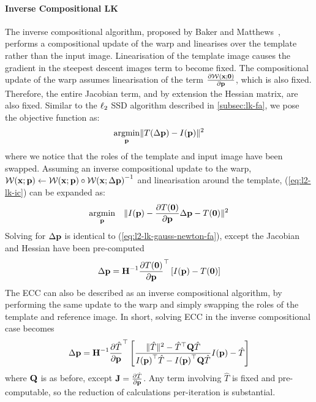\paragraph{Inverse Compositional LK}\label{subsubsec:lk-ic}
The inverse compositional algorithm, proposed by Baker and
Matthews~\cite{RefWorks:74}, performs a compositional update of the warp and
linearises over the template rather than the input image. Linearisation of the
template image causes the gradient in the steepest descent images term to become
fixed. The compositional update of the warp assumes linearisation of the term
$\frac{\partial \mathcal{W}(\boldsymbol{\mathbf{x}};\boldsymbol{\mathbf{0}})}{\partial \boldsymbol{\mathbf{p}}}$, which is also
fixed. Therefore, the entire Jacobian term, and by extension the Hessian matrix,
are also fixed. Similar to the $\ell_2$ SSD algorithm described in
\cref{subsec:lk-fa}, we pose the objective function as:
\begin{equation}\label{eq:l2-lk-ic}
    \argmin_{\p} \norm{T(\Delta \p) - I(\p)}^2
\end{equation}
where we notice that the roles of the template and input image have been
swapped. Assuming an inverse compositional update to the warp,
$\mathcal{W}(\boldsymbol{\mathbf{x}};\boldsymbol{\mathbf{p}}) \leftarrow \mathcal{W}(\boldsymbol{\mathbf{x}};\boldsymbol{\mathbf{p}}) \circ {\mathcal{W}(\boldsymbol{\mathbf{x}};\Delta \boldsymbol{\mathbf{p}})}^{-1}$
and linearisation around the template, (\ref{eq:l2-lk-ic}) can be expanded as:
\begin{equation}\label{eq:l2-lk-linearised-ic}
    \argmin_{\p} \quad \norm{I(\p) - \frac{\partial T(\zero)}{\partial \p} \Delta \p - T(\zero)}^2
\end{equation}
Solving for $\Delta \boldsymbol{\mathbf{p}}$ is identical to (\ref{eq:l2-lk-gauss-newton-fa}), except
the Jacobian and Hessian have been pre-computed
\begin{equation}\label{eq:l2-lk-gauss-newton-ic}
    \Delta \boldsymbol{\mathbf{p}} = \boldsymbol{\mathbf{H}}^{-1} \frac{\partial T(\boldsymbol{\mathbf{0}})}{\partial \boldsymbol{\mathbf{p}}}^{\top} \left[ I(\boldsymbol{\mathbf{p}}) - T(\boldsymbol{\mathbf{0}}) \right]
\end{equation}
The ECC can also be described as an inverse compositional algorithm, by
performing the same update to the warp and simply swapping the roles of the
template and reference image. In short, solving ECC in the inverse compositional
case becomes
\begin{equation}\label{eq:ecc-lk-gauss-newton-ic}
    \Delta \boldsymbol{\mathbf{p}} = \boldsymbol{\mathbf{H}}^{-1} \frac{\partial \hat{T}}{\partial \boldsymbol{\mathbf{p}}}^{\top} \left[ \frac{\lVert{} \hat{T} \rVert^2 - \hat{T}^{\top} \boldsymbol{\mathbf{Q}} \hat{T}}{{I(\boldsymbol{\mathbf{p}})}^{\top} \hat{T} - {I(\boldsymbol{\mathbf{p}})}^{\top} \boldsymbol{\mathbf{Q}} \hat{T}} I(\boldsymbol{\mathbf{p}}) - \hat{T} \right]
\end{equation}
where $\boldsymbol{\mathbf{Q}}$ is as before, except $\boldsymbol{\mathbf{J}} = \frac{\partial \hat{T}}{\partial \boldsymbol{\mathbf{p}}}$. 
Any term involving $\hat{T}$ is fixed and pre-computable, so the reduction of 
calculations per-iteration is substantial.


